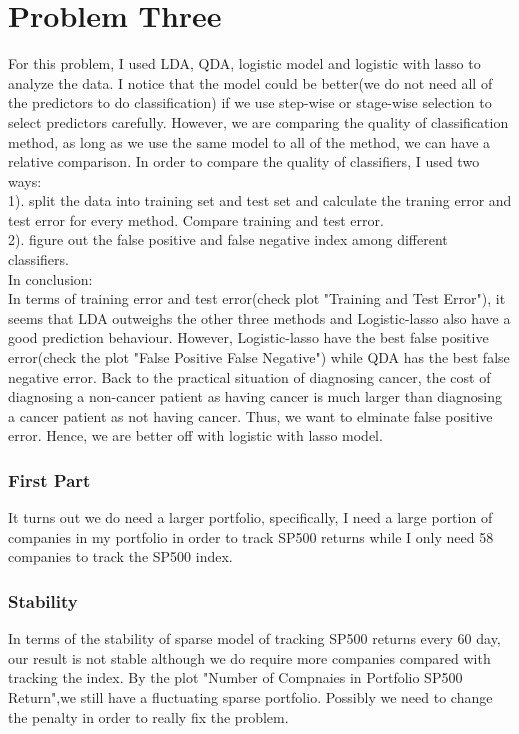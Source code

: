 \documentclass{article}\usepackage[]{graphicx}\usepackage[]{color}
\begin{document}
\section*{Problem Three}
For this problem, I used LDA, QDA, logistic model and logistic with lasso to analyze the data. I notice that the model could be better(we do not need all of the predictors to do classification) if we use step-wise or stage-wise selection to select predictors carefully. However, we are comparing the quality of classification method, as long as we use the same model to all of the method, we can have a relative comparison. In order to compare the quality of classifiers, I used two ways:\\
1). split the data into training set and test set and calculate the traning error and test error for every method. Compare training and test error.\\
2). figure out the false positive and false negative index among different classifiers.\\
In conclusion:\\
In terms of training error and test error(check plot "Training and Test Error"), it seems that LDA outweighs the other three methods and Logistic-lasso also have a good prediction behaviour. However, Logistic-lasso have the best false positive error(check the plot "False Positive False Negative") while QDA has the best false negative error. Back to the practical situation of diagnosing cancer, the cost of diagnosing a non-cancer patient as having cancer is much larger than diagnosing a cancer patient as not having cancer. Thus, we want to elminate false positive error. Hence, we are better off with logistic with lasso model.

\subsubsection*{First Part}
It turns out we do need a larger portfolio, specifically, I need a large portion of companies in my portfolio in order to track SP500 returns while I only need 58 companies to track the SP500 index.\\
\subsubsection*{Stability}
In terms of the stability of sparse model of tracking SP500 returns every 60 day, our result is not stable although we do require more companies compared with tracking the index. By the plot "Number of Compnaies in Portfolio SP500 Return",we still have a fluctuating sparse portfolio. Possibly we need to change the penalty in order to really fix the problem. 
\end{document}
